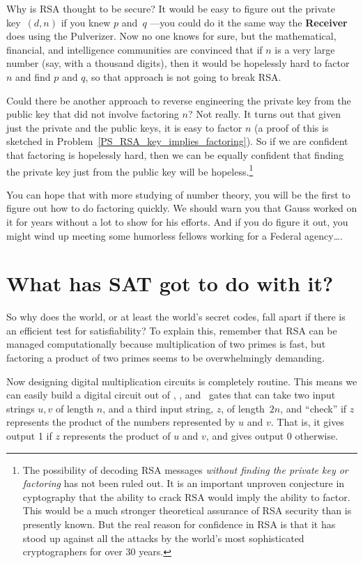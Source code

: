 Why is RSA thought to be secure?  It would be easy to figure out the private key~$(d, n)$
if you knew $p$ and~$q$ ---you could do it the same way the \textbf{Receiver} does using
the Pulverizer.  Now no one knows for sure, but the mathematical, financial, and
intelligence communities are convinced that if $n$ is a very large number (say, with a
thousand digits), then it would be hopelessly hard to factor $n$ and find $p$ and $q$, so
that approach is not going to break RSA.

Could there be another approach to reverse engineering the private key from the public key
that did not involve factoring $n$?  Not really.  It turns out that given just the private
and the public keys, it is easy to factor $n$ (a proof of this is sketched in
Problem~\ref{PS_RSA_key_implies_factoring}).  So if we are confident that factoring is
hopelessly hard, then we can be equally confident that finding the private key just from
the public key will be hopeless.\footnote{The possibility of decoding RSA messages
  \emph{without finding the private key or factoring} has not been ruled out.  It is an
  important unproven conjecture in cyptography that the ability to crack RSA would imply
  the ability to factor.  This would be a much stronger theoretical assurance of RSA
  security than is presently known.  But the real reason for confidence in RSA is that it
  has stood up against all the attacks by the world's most sophisticated cryptographers for
  over 30 years.}

You can hope that with more studying of number theory, you will be the first to figure out
how to do factoring quickly.  We should warn you that Gauss worked on it for years without
a lot to show for his efforts.  And if you do figure it out, you might wind up meeting some
humorless fellows working for a Federal agency\dots.

\section{What has SAT got to do with it?}\label{SAT_RSA_sec}
So why does the world, or at least the world's secret codes, fall apart if there is an
efficient test for satisfiability?  To explain this, remember that RSA can be managed
computationally because multiplication of two primes is fast, but factoring a product of
two primes seems to be overwhelmingly demanding.

Now designing digital multiplication circuits is completely routine.  This means we can
easily build a digital circuit out of \QAND, \QOR, and \QNOT\ gates that can take two input
strings $u,v$ of length $n$, and a third input string, $z$, of length~$2n$, and ``check''
if $z$ represents the product of the numbers represented by $u$ and $v$.  That is, it gives
output 1 if $z$ represents the product of $u$ and $v$, and gives output 0 otherwise.

